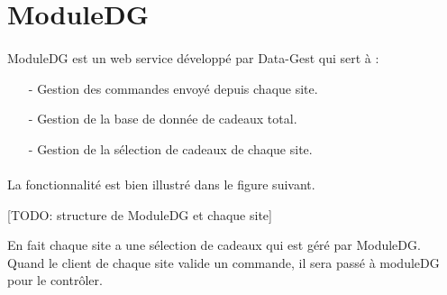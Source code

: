 \section{ModuleDG}

\paragraph{}
ModuleDG est un web service développé par Data-Gest qui sert à :
\begin{itemize}
\item [-] Gestion des commandes envoyé depuis chaque site.
\item [-] Gestion de la base de donnée de cadeaux total. 
\item [-] Gestion de la sélection de cadeaux de chaque site.
\end{itemize}

\paragraph{}
La fonctionnalité est bien illustré dans le figure suivant.

[TODO: structure de ModuleDG et chaque site]

En fait chaque site a une sélection de cadeaux qui est géré par  ModuleDG. Quand le client de chaque site valide un commande, il sera passé à moduleDG pour le contrôler. 

